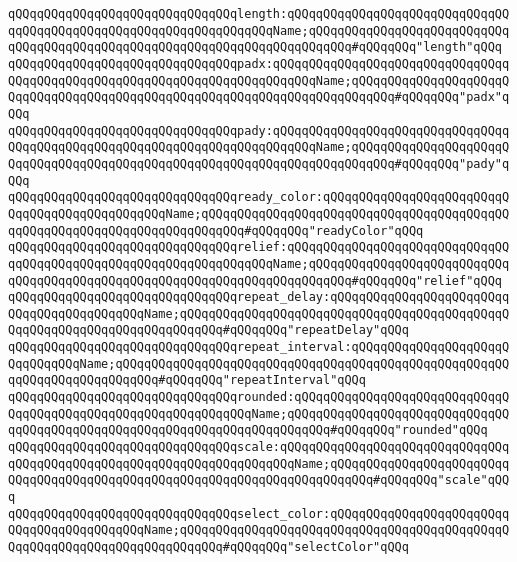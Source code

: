 \verb|qQQqqQQqqQQqqQQqqQQqqQQqqQQqqQQqlength:qQQqqQQqqQQqqQQqqQQqqQQqqQQqqQQqqQQqqQQqqQQqqQQqqQQqqQQqqQQqqQQqqQQqName;qQQqqQQqqQQqqQQqqQQqqQQqqQQqqQQqqQQqqQQqqQQqqQQqqQQqqQQqqQQqqQQqqQQqqQQqqQQq#qQQqqQQq"length"qQQq|\newline
\newline
\verb|qQQqqQQqqQQqqQQqqQQqqQQqqQQqqQQqpadx:qQQqqQQqqQQqqQQqqQQqqQQqqQQqqQQqqQQqqQQqqQQqqQQqqQQqqQQqqQQqqQQqqQQqqQQqqQQqName;qQQqqQQqqQQqqQQqqQQqqQQqqQQqqQQqqQQqqQQqqQQqqQQqqQQqqQQqqQQqqQQqqQQqqQQqqQQq#qQQqqQQq"padx"qQQq|\newline
\verb|qQQqqQQqqQQqqQQqqQQqqQQqqQQqqQQqpady:qQQqqQQqqQQqqQQqqQQqqQQqqQQqqQQqqQQqqQQqqQQqqQQqqQQqqQQqqQQqqQQqqQQqqQQqqQQqName;qQQqqQQqqQQqqQQqqQQqqQQqqQQqqQQqqQQqqQQqqQQqqQQqqQQqqQQqqQQqqQQqqQQqqQQqqQQq#qQQqqQQq"pady"qQQq|\newline
\newline
\verb|qQQqqQQqqQQqqQQqqQQqqQQqqQQqqQQqready_color:qQQqqQQqqQQqqQQqqQQqqQQqqQQqqQQqqQQqqQQqqQQqqQQqName;qQQqqQQqqQQqqQQqqQQqqQQqqQQqqQQqqQQqqQQqqQQqqQQqqQQqqQQqqQQqqQQqqQQqqQQqqQQq#qQQqqQQq"readyColor"qQQq|\newline
\verb|qQQqqQQqqQQqqQQqqQQqqQQqqQQqqQQqrelief:qQQqqQQqqQQqqQQqqQQqqQQqqQQqqQQqqQQqqQQqqQQqqQQqqQQqqQQqqQQqqQQqqQQqName;qQQqqQQqqQQqqQQqqQQqqQQqqQQqqQQqqQQqqQQqqQQqqQQqqQQqqQQqqQQqqQQqqQQqqQQqqQQq#qQQqqQQq"relief"qQQq|\newline
\verb|qQQqqQQqqQQqqQQqqQQqqQQqqQQqqQQqrepeat_delay:qQQqqQQqqQQqqQQqqQQqqQQqqQQqqQQqqQQqqQQqqQQqName;qQQqqQQqqQQqqQQqqQQqqQQqqQQqqQQqqQQqqQQqqQQqqQQqqQQqqQQqqQQqqQQqqQQqqQQqqQQq#qQQqqQQq"repeatDelay"qQQq|\newline
\newline
\verb|qQQqqQQqqQQqqQQqqQQqqQQqqQQqqQQqrepeat_interval:qQQqqQQqqQQqqQQqqQQqqQQqqQQqqQQqName;qQQqqQQqqQQqqQQqqQQqqQQqqQQqqQQqqQQqqQQqqQQqqQQqqQQqqQQqqQQqqQQqqQQqqQQqqQQq#qQQqqQQq"repeatInterval"qQQq|\newline
\verb|qQQqqQQqqQQqqQQqqQQqqQQqqQQqqQQqrounded:qQQqqQQqqQQqqQQqqQQqqQQqqQQqqQQqqQQqqQQqqQQqqQQqqQQqqQQqqQQqqQQqName;qQQqqQQqqQQqqQQqqQQqqQQqqQQqqQQqqQQqqQQqqQQqqQQqqQQqqQQqqQQqqQQqqQQqqQQqqQQq#qQQqqQQq"rounded"qQQq|\newline
\newline
\verb|qQQqqQQqqQQqqQQqqQQqqQQqqQQqqQQqscale:qQQqqQQqqQQqqQQqqQQqqQQqqQQqqQQqqQQqqQQqqQQqqQQqqQQqqQQqqQQqqQQqqQQqqQQqName;qQQqqQQqqQQqqQQqqQQqqQQqqQQqqQQqqQQqqQQqqQQqqQQqqQQqqQQqqQQqqQQqqQQqqQQqqQQq#qQQqqQQq"scale"qQQq|\newline
\verb|qQQqqQQqqQQqqQQqqQQqqQQqqQQqqQQqselect_color:qQQqqQQqqQQqqQQqqQQqqQQqqQQqqQQqqQQqqQQqqQQqName;qQQqqQQqqQQqqQQqqQQqqQQqqQQqqQQqqQQqqQQqqQQqqQQqqQQqqQQqqQQqqQQqqQQqqQQqqQQq#qQQqqQQq"selectColor"qQQq|\newline
